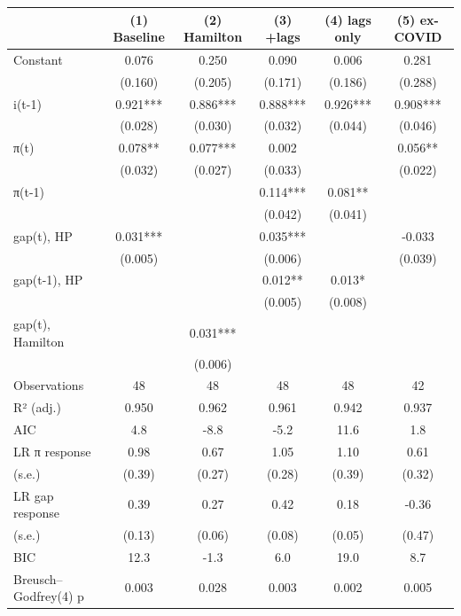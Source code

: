 \begin{tabular}{lccccc}
\toprule
 & (1) Baseline & (2) Hamilton & (3) +lags & (4) lags only & (5) ex-COVID \\
\midrule
Constant & 0.076 & 0.250 & 0.090 & 0.006 & 0.281 \\
   & (0.160) & (0.205) & (0.171) & (0.186) & (0.288) \\
i(t-1) & 0.921*** & 0.886*** & 0.888*** & 0.926*** & 0.908*** \\
     & (0.028) & (0.030) & (0.032) & (0.044) & (0.046) \\
π(t) & 0.078** & 0.077*** & 0.002 &  & 0.056** \\
       & (0.032) & (0.027) & (0.033) &  & (0.022) \\
π(t-1) &  &  & 0.114*** & 0.081** &  \\
         &  &  & (0.042) & (0.041) &  \\
gap(t), HP & 0.031*** &  & 0.035*** &  & -0.033 \\
           & (0.005) &  & (0.006) &  & (0.039) \\
gap(t-1), HP &  &  & 0.012** & 0.013* &  \\
             &  &  & (0.005) & (0.008) &  \\
gap(t), Hamilton &  & 0.031*** &  &  &  \\
               &  & (0.006) &  &  &  \\
Observations & 48 & 48 & 48 & 48 & 42 \\
R² (adj.) & 0.950 & 0.962 & 0.961 & 0.942 & 0.937 \\
AIC & 4.8 & -8.8 & -5.2 & 11.6 & 1.8 \\
LR π response & 0.98 & 0.67 & 1.05 & 1.10 & 0.61 \\
  (s.e.) & (0.39) & (0.27) & (0.28) & (0.39) & (0.32) \\
LR gap response & 0.39 & 0.27 & 0.42 & 0.18 & -0.36 \\
  (s.e.)  & (0.13) & (0.06) & (0.08) & (0.05) & (0.47) \\
BIC & 12.3 & -1.3 & 6.0 & 19.0 & 8.7 \\
Breusch–Godfrey(4) p & 0.003 & 0.028 & 0.003 & 0.002 & 0.005 \\
\bottomrule
\end{tabular}
